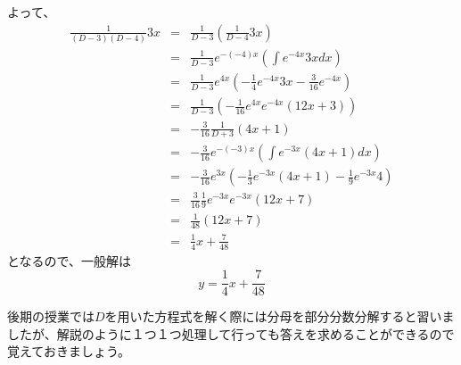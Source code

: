 \documentclass[a4j]{jsarticle}
\begin{document}
\begin{spacing}{1.6}
\begin{qparts}
   よって、
   \begin{eqnarray*}
     \frac{1}{(D - 3)(D - 4)}3x & = & \frac{1}{D - 3} \left(\frac{1}{D - 4}3x\right) \\
     & = & \frac{1}{D - 3}e ^ {-(-4)x}\left(\int e ^ {-4x}3xdx\right) \\
     & = & \frac{1}{D - 3}e ^ {4x} \left(-\frac{1}{4}e ^ {-4x}3x - \frac{3}{16}e ^ {-4x}\right) \\
     & = & \frac{1}{D - 3} \left(-\frac{1}{16}e ^ {4x}e ^ {-4x} (12x + 3)\right) \\
     & = & -\frac{3}{16} \frac{1}{D + 3}(4x + 1) \\
     & = & -\frac{3}{16} e ^{-(-3)x} \left(\int e ^ {-3x}(4x + 1) dx \right) \\
     & = & -\frac{3}{16}e ^ {3x} \left(-\frac{1}{3}e ^ {-3x}(4x + 1) - \frac{1}{9}e ^ {-3x} 4 \right) \\
     & = & \frac{3}{16} \frac{1}{9}e ^ {-3x}e ^ {-3x}(12x + 7) \\
     & = & \frac{1}{48}(12x + 7) \\
     & = & \frac{1}{4}x + \frac{7}{48}
   \end{eqnarray*}
   となるので、一般解は
   \begin{equation*}
     y = \frac{1}{4}x + \frac{7}{48}
   \end{equation*}
  \end{qparts}
  \end{spacing}
  \begin{shadebox}
    後期の授業では$D$を用いた方程式を解く際には分母を部分分数分解すると習いましたが、解説のように１つ１つ処理して行っても答えを求めることができるので覚えておきましょう。
  \end{shadebox}
\end{document}
